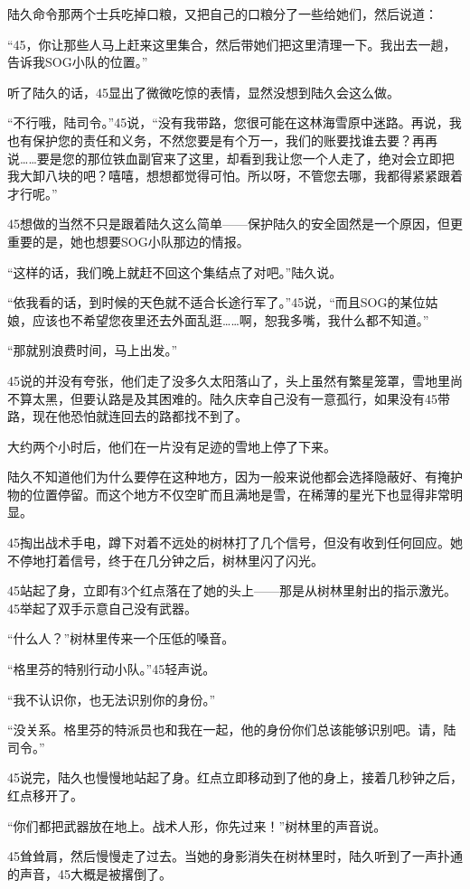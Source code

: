 陆久命令那两个士兵吃掉口粮，又把自己的口粮分了一些给她们，然后说道：

“45，你让那些人马上赶来这里集合，然后带她们把这里清理一下。我出去一趟，告诉我SOG小队的位置。”

听了陆久的话，45显出了微微吃惊的表情，显然没想到陆久会这么做。

“不行哦，陆司令。”45说，“没有我带路，您很可能在这林海雪原中迷路。再说，我也有保护您的责任和义务，不然您要是有个万一，我们的账要找谁去要？再再说……要是您的那位铁血副官来了这里，却看到我让您一个人走了，绝对会立即把我大卸八块的吧？嘻嘻，想想都觉得可怕。所以呀，不管您去哪，我都得紧紧跟着才行呢。”

45想做的当然不只是跟着陆久这么简单——保护陆久的安全固然是一个原因，但更重要的是，她也想要SOG小队那边的情报。

“这样的话，我们晚上就赶不回这个集结点了对吧。”陆久说。

“依我看的话，到时候的天色就不适合长途行军了。”45说，“而且SOG的某位姑娘，应该也不希望您夜里还去外面乱逛……啊，恕我多嘴，我什么都不知道。”

“那就别浪费时间，马上出发。”

45说的并没有夸张，他们走了没多久太阳落山了，头上虽然有繁星笼罩，雪地里尚不算太黑，但要认路是及其困难的。陆久庆幸自己没有一意孤行，如果没有45带路，现在他恐怕就连回去的路都找不到了。

大约两个小时后，他们在一片没有足迹的雪地上停了下来。

陆久不知道他们为什么要停在这种地方，因为一般来说他都会选择隐蔽好、有掩护物的位置停留。而这个地方不仅空旷而且满地是雪，在稀薄的星光下也显得非常明显。

45掏出战术手电，蹲下对着不远处的树林打了几个信号，但没有收到任何回应。她不停地打着信号，终于在几分钟之后，树林里闪了闪光。

45站起了身，立即有3个红点落在了她的头上——那是从树林里射出的指示激光。45举起了双手示意自己没有武器。

“什么人？”树林里传来一个压低的嗓音。

“格里芬的特别行动小队。”45轻声说。

“我不认识你，也无法识别你的身份。”

“没关系。格里芬的特派员也和我在一起，他的身份你们总该能够识别吧。请，陆司令。”

45说完，陆久也慢慢地站起了身。红点立即移动到了他的身上，接着几秒钟之后，红点移开了。

“你们都把武器放在地上。战术人形，你先过来！”树林里的声音说。

45耸耸肩，然后慢慢走了过去。当她的身影消失在树林里时，陆久听到了一声扑通的声音，45大概是被撂倒了。

